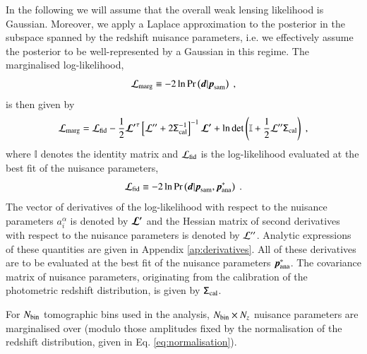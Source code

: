 \documentclass{aa}
\newcommand{\eq}[1]{\begin{equation}  #1 \end{equation}}
\newcommand{\br}[1]{\left( #1 \right)}
\newcommand{\bb}[1]{\left[ #1 \right]}
\newcommand{\pr}{{\rm Pr}}
\begin{document}
In the following we will assume that the overall weak lensing likelihood is Gaussian. Moreover, we apply a Laplace approximation to the posterior in the subspace spanned by the redshift nuisance parameters, i.e. we effectively assume the posterior to be well-represented by a Gaussian in this regime. The marginalised log-likelihood,
\eq{
{\cal L}_{\rm marg}  \equiv -2 \ln \pr \br{\boldsymbol{d} | \boldsymbol{p}_{\rm sam}}\;,
}
is then given by \citep{bridle02, taylor10}
\eq{
\label{eq:marginal_likelihood}
{\cal L}_{\rm marg} = {\cal L}_{\rm fid} - \frac{1}{2} \boldsymbol{\cal L^\prime}^\tau  \bb{ {\cal L^{\prime\prime}} + 2 \tens{\Sigma}^{-1}_{\rm cal} }^{-1} \boldsymbol{\cal L^\prime} + \ln \det \br{ \mathbb{I} + \frac{1}{2} {\cal L^{\prime\prime}} \tens{\Sigma}_{\rm cal}}\;,
}
where $\mathbb{I}$ denotes the identity matrix and ${\cal L}_{\rm fid}$ is the log-likelihood evaluated at the best fit of the nuisance parameters,
\eq{
{\cal L}_{\rm fid} \equiv -2 \ln \pr \br{\boldsymbol{d} | \boldsymbol{p}_{\rm sam}, \boldsymbol{p}^*_{\rm ana}}\;.
}
The vector of derivatives of the log-likelihood with respect to the nuisance parameters $a_i^\alpha$ is denoted by $\boldsymbol{\cal L^\prime}$ and the Hessian matrix of second derivatives with respect to the nuisance parameters is denoted by ${\cal L^{\prime\prime}}$. Analytic expressions of these quantities are given in Appendix \ref{ap:derivatives}. All of these derivatives are to be evaluated at the best fit of the nuisance parameters $\boldsymbol{p}^*_{\rm ana}$. The covariance matrix of nuisance parameters, originating from the calibration of the photometric redshift distribution, is given by $\mathsf{\Sigma}_{\rm cal} $.

For $N_{\rm bin}$ tomographic bins used in the analysis, $N_{\rm bin} \times N_z$ nuisance parameters are marginalised over (modulo those amplitudes fixed by the normalisation of the redshift distribution, given in Eq. \eqref{eq:normalisation}).
\end{document}
